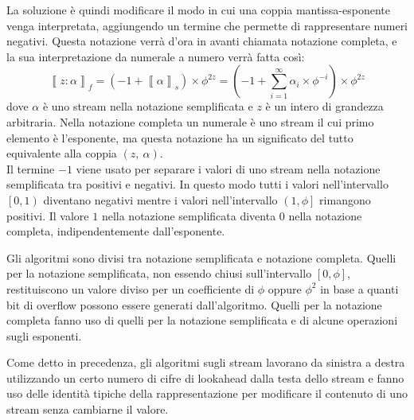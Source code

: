 \documentclass[Lau]{sapthesis}
\begin{document}
La soluzione è quindi modificare il modo in cui una coppia mantissa-esponente venga interpretata, aggiungendo un termine che permette di rappresentare numeri negativi. Questa notazione verrà d'ora in avanti chiamata notazione completa, e la sua interpretazione da numerale a numero verrà fatta così:
$$\left\llbracket z:\alpha \right\rrbracket_f = \left( -1 + \left\llbracket \alpha \right\rrbracket_s \right) \times \phi^{2z} = \left( -1 + \sum_{i=1}^{\infty} \alpha_i \times \phi^{-i} \right) \times \phi^{2z}$$
dove $\alpha$ è uno stream nella notazione semplificata e $z$ è un intero di grandezza arbitraria. Nella notazione completa un numerale è uno stream il cui primo elemento è l'esponente, ma questa notazione ha un significato del tutto equivalente alla coppia $(z, \ \alpha)$.\\
Il termine $-1$ viene usato per separare i valori di uno stream nella notazione semplificata tra positivi e negativi. In questo modo tutti i valori nell'intervallo $\left[0,1\right)$ diventano negativi mentre i valori nell'intervallo $\left(1,\phi\right]$ rimangono positivi. Il valore $1$ nella notazione semplificata diventa $0$ nella notazione completa, indipendentemente dall'esponente.

Gli algoritmi sono divisi tra notazione semplificata e notazione completa. Quelli per la notazione semplificata, non essendo chiusi sull'intervallo $\left[0,\phi\right]$, restituiscono un valore diviso per un coefficiente di $\phi$ oppure $\phi^2$ in base a quanti bit di overflow possono essere generati dall'algoritmo. Quelli per la notazione completa fanno uso di quelli per la notazione semplificata e di alcune operazioni sugli esponenti.

Come detto in precedenza, gli algoritmi sugli stream lavorano da sinistra a destra utilizzando un certo numero di cifre di lookahead dalla testa dello stream e fanno uso delle identità tipiche della rappresentazione per modificare il contenuto di uno stream senza cambiarne il valore.
\end{document}
